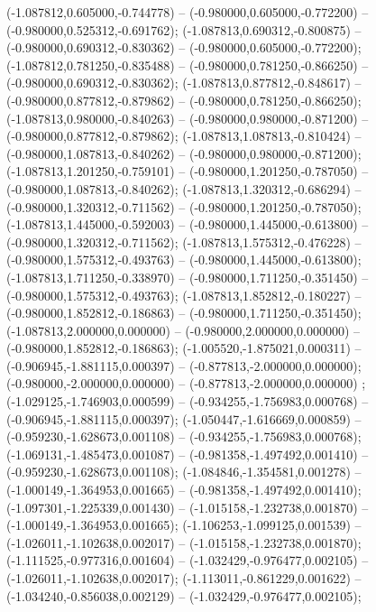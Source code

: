  (-1.087812,0.605000,-0.744778) -- (-0.980000,0.605000,-0.772200) -- (-0.980000,0.525312,-0.691762);
 (-1.087813,0.690312,-0.800875) -- (-0.980000,0.690312,-0.830362) -- (-0.980000,0.605000,-0.772200);
 (-1.087812,0.781250,-0.835488) -- (-0.980000,0.781250,-0.866250) -- (-0.980000,0.690312,-0.830362);
 (-1.087813,0.877812,-0.848617) -- (-0.980000,0.877812,-0.879862) -- (-0.980000,0.781250,-0.866250);
 (-1.087813,0.980000,-0.840263) -- (-0.980000,0.980000,-0.871200) -- (-0.980000,0.877812,-0.879862);
 (-1.087813,1.087813,-0.810424) -- (-0.980000,1.087813,-0.840262) -- (-0.980000,0.980000,-0.871200);
 (-1.087813,1.201250,-0.759101) -- (-0.980000,1.201250,-0.787050) -- (-0.980000,1.087813,-0.840262);
 (-1.087813,1.320312,-0.686294) -- (-0.980000,1.320312,-0.711562) -- (-0.980000,1.201250,-0.787050);
 (-1.087813,1.445000,-0.592003) -- (-0.980000,1.445000,-0.613800) -- (-0.980000,1.320312,-0.711562);
 (-1.087813,1.575312,-0.476228) -- (-0.980000,1.575312,-0.493763) -- (-0.980000,1.445000,-0.613800);
 (-1.087813,1.711250,-0.338970) -- (-0.980000,1.711250,-0.351450) -- (-0.980000,1.575312,-0.493763);
 (-1.087813,1.852812,-0.180227) -- (-0.980000,1.852812,-0.186863) -- (-0.980000,1.711250,-0.351450);
 (-1.087813,2.000000,0.000000) -- (-0.980000,2.000000,0.000000) -- (-0.980000,1.852812,-0.186863);
 (-1.005520,-1.875021,0.000311) -- (-0.906945,-1.881115,0.000397) -- (-0.877813,-2.000000,0.000000);
 (-0.980000,-2.000000,0.000000) -- (-0.877813,-2.000000,0.000000) ;
 (-1.029125,-1.746903,0.000599) -- (-0.934255,-1.756983,0.000768) -- (-0.906945,-1.881115,0.000397);
 (-1.050447,-1.616669,0.000859) -- (-0.959230,-1.628673,0.001108) -- (-0.934255,-1.756983,0.000768);
 (-1.069131,-1.485473,0.001087) -- (-0.981358,-1.497492,0.001410) -- (-0.959230,-1.628673,0.001108);
 (-1.084846,-1.354581,0.001278) -- (-1.000149,-1.364953,0.001665) -- (-0.981358,-1.497492,0.001410);
 (-1.097301,-1.225339,0.001430) -- (-1.015158,-1.232738,0.001870) -- (-1.000149,-1.364953,0.001665);
 (-1.106253,-1.099125,0.001539) -- (-1.026011,-1.102638,0.002017) -- (-1.015158,-1.232738,0.001870);
 (-1.111525,-0.977316,0.001604) -- (-1.032429,-0.976477,0.002105) -- (-1.026011,-1.102638,0.002017);
 (-1.113011,-0.861229,0.001622) -- (-1.034240,-0.856038,0.002129) -- (-1.032429,-0.976477,0.002105);
